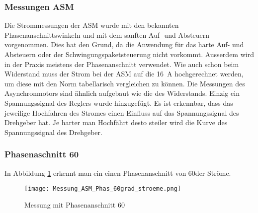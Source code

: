 \newpage
\subsubsection{Messungen ASM}
Die Strommessungen der ASM wurde mit den bekannten Phasenanschnittswinkeln und mit dem sanften Auf- und Absteuern vorgenommen. Dies hat den Grund, da die Anwendung für das harte Auf- und Absteuern oder der Schwingungspaketsteuerung nicht vorkommt. Ausserdem wird in der Praxis meistens der Phasenanschnitt verwendet. Wie auch schon beim Widerstand muss der Strom bei der ASM auf die \SI{16}{A} hochgerechnet werden, um diese mit den Norm tabellarisch vergleichen zu können. Die Messungen des Asynchronmotors sind ähnlich aufgebaut wie die des Widerstands. Einzig ein Spannungssignal des Reglers wurde hinzugefügt. Es ist erkennbar, dass das jeweilige Hochfahren des Stromes einen Einfluss auf das Spannungssignal des Drehgeber hat. Je harter man Hochfährt desto steiler wird die Kurve des Spannungssignal des Drehgeber. 


\subsubsection*{Phasenaschnitt 60\textdegree}
In Abbildung \ref{fig:Mess_Phas_60grad_stroeme} erkennt man ein einen Phasenanschnitt von 60\textdegree der Ströme.

\begin{figure}[ht!]
	\centering
	\texttt{[image: Messung\_ASM\_Phas\_60grad\_stroeme.png]}	
	\caption{Messung mit Phasenanschnitt 60\textdegree}\label{fig:Mess_Phas_60grad_stroeme}
\end{figure}

